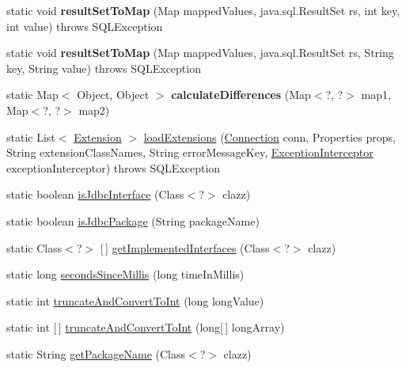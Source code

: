 \begin{DoxyCompactItemize}
\item 
\mbox{\label{classcom_1_1mysql_1_1jdbc_1_1_util_aa6aea161c0d1e35004ff37b7a9054596}} 
static void {\bfseries result\+Set\+To\+Map} (Map mapped\+Values, java.\+sql.\+Result\+Set rs, int key, int value)  throws S\+Q\+L\+Exception 
\item 
\mbox{\label{classcom_1_1mysql_1_1jdbc_1_1_util_a1e96a670494944ce836e5f20e0695f8f}} 
static void {\bfseries result\+Set\+To\+Map} (Map mapped\+Values, java.\+sql.\+Result\+Set rs, String key, String value)  throws S\+Q\+L\+Exception 
\item 
\mbox{\label{classcom_1_1mysql_1_1jdbc_1_1_util_af113dacf6b0386f53326e24976249385}} 
static Map$<$ Object, Object $>$ {\bfseries calculate\+Differences} (Map$<$?, ?$>$ map1, Map$<$?, ?$>$ map2)
\item 
static List$<$ \mbox{\hyperlink{interfacecom_1_1mysql_1_1jdbc_1_1_extension}{Extension}} $>$ \mbox{\hyperlink{classcom_1_1mysql_1_1jdbc_1_1_util_a7437eb4eaa7c101657b58d764e825f62}{load\+Extensions}} (\mbox{\hyperlink{interfacecom_1_1mysql_1_1jdbc_1_1_connection}{Connection}} conn, Properties props, String extension\+Class\+Names, String error\+Message\+Key, \mbox{\hyperlink{interfacecom_1_1mysql_1_1jdbc_1_1_exception_interceptor}{Exception\+Interceptor}} exception\+Interceptor)  throws S\+Q\+L\+Exception 
\item 
static boolean \mbox{\hyperlink{classcom_1_1mysql_1_1jdbc_1_1_util_ad3d011a699b9fccde5f515f9fbd5b5f3}{is\+Jdbc\+Interface}} (Class$<$?$>$ clazz)
\item 
static boolean \mbox{\hyperlink{classcom_1_1mysql_1_1jdbc_1_1_util_a9cb2ac4a8521a60214e3186ad634b3b3}{is\+Jdbc\+Package}} (String package\+Name)
\item 
static Class$<$?$>$ \mbox{[}$\,$\mbox{]} \mbox{\hyperlink{classcom_1_1mysql_1_1jdbc_1_1_util_a35e35548da42c684a68e73f8ccfc2fdb}{get\+Implemented\+Interfaces}} (Class$<$?$>$ clazz)
\item 
static long \mbox{\hyperlink{classcom_1_1mysql_1_1jdbc_1_1_util_a3984ee75dc7002232216fbbcd1771459}{seconds\+Since\+Millis}} (long time\+In\+Millis)
\item 
static int \mbox{\hyperlink{classcom_1_1mysql_1_1jdbc_1_1_util_ab73dd640e4fb69c157001303d7be0164}{truncate\+And\+Convert\+To\+Int}} (long long\+Value)
\item 
static int \mbox{[}$\,$\mbox{]} \mbox{\hyperlink{classcom_1_1mysql_1_1jdbc_1_1_util_aa422ec3d75ddc371d540e31156472513}{truncate\+And\+Convert\+To\+Int}} (long\mbox{[}$\,$\mbox{]} long\+Array)
\item 
static String \mbox{\hyperlink{classcom_1_1mysql_1_1jdbc_1_1_util_a30a2020999202ce3bb0871498f6bcc5b}{get\+Package\+Name}} (Class$<$?$>$ clazz)
\end{DoxyCompactItemize}


